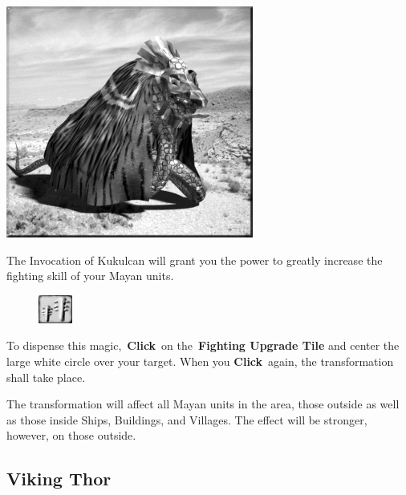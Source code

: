 \begin{center}
	\includegraphics[width=1\linewidth]{Akukulcan}
\end{center}

The Invocation of Kukulcan will grant you the power to greatly increase the fighting skill of your Mayan units.

\begin{figure}
	\vspace{-20pt}
	\begin{center}
		\includegraphics[width=0.1\textwidth]{Tfightupgrade}
	\end{center}
	\vspace{-20pt}
\end{figure}

To dispense this magic, \textbf{Click} on the \textbf{Fighting Upgrade Tile} and center the large white circle over your target. When you \textbf{Click} again, the transformation shall take place.

The transformation will affect all Mayan units in the area, those outside as well as those inside Ships, Buildings, and Villages. The effect will be stronger, however, on those outside.

\subsection{Viking Thor}

